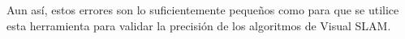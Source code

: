 Aun así, estos errores son lo suficientemente pequeños como para que se utilice esta herramienta para validar la precisión de los algoritmos de Visual SLAM.



\clearpage
\newpage



















